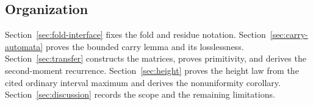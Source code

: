 \subsection{Organization}
Section~\ref{sec:fold-interface} fixes the fold and residue notation.
Section~\ref{sec:carry-automata} proves the bounded carry lemma and its
losslessness.  Section~\ref{sec:transfer} constructs the matrices, proves
primitivity, and derives the second-moment recurrence.  Section~\ref{sec:height}
proves the height law from the cited ordinary interval maximum and derives
the nonuniformity corollary.  Section~\ref{sec:discussion} records the scope
and the remaining limitations.
